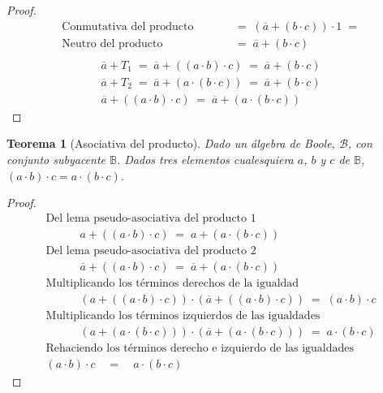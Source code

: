 \documentclass[final,12pt,a4paper,twoside,fleqn]{extbook}
\newcommand{\setB}{\ensuremath{\mathbb{B}}}
\newtheorem{thm}{Teorema}[chapter]
\theoremstyle{definition}
\theoremstyle{remark}
\begin{document}
\begin{proof}
\begin{align}
\text{Conmutativa del producto}\qquad&{}&=\; \left( \overline{a} + \left( b \cdot c \right) \right) \cdot 1 \;=\\
\text{Neutro del producto}\qquad&{}&=\; \overline{a} + \left( b \cdot c \right) \;\;\\
\end{align}
\begin{align}
\overline{a} + T_1 \;=\; \overline{a} + \left( \left( a \cdot b \right) \cdot c \right) \;=\; \overline{a} + \left( b \cdot c \right)\\
\overline{a} + T_2 \;=\; \overline{a} + \left( a \cdot \left( b \cdot c \right) \right) \;=\; \overline{a} + \left( b \cdot c \right)\\
\overline{a} + \left( \left( a \cdot b \right) \cdot c \right) \;=\; \overline{a} + \left( a \cdot \left( b \cdot c \right) \right) 
\end{align}
\end{proof}



\begin{thm}[Asociativa del producto]
Dado un álgebra de Boole, \(\mathscr{B}\), con conjunto subyacente \(\setB\). Dados tres elementos cualesquiera \(a\), \(b\) y \(c\) de \(\setB\), \( ( a \cdot b ) \cdot c = a \cdot ( b \cdot c ) \).
\end{thm}



\begin{proof}
\begin{align}
\text{Del lema pseudo-asociativa del producto 1}\\
\qquad\quad a + \left( \left( a \cdot b \right) \cdot c \right) \;=\; a + \left( a \cdot \left( b \cdot c \right) \right) \\ 
\text{Del lema pseudo-asociativa del producto 2}\\
\qquad\quad \overline{a} + \left( \left( a \cdot b \right) \cdot c \right) \;=\; \overline{a} + \left( a \cdot \left( b \cdot c \right) \right) \\
\text{Multiplicando los términos derechos de la igualdad}\\
\qquad\quad \left(a + \left( \left( a \cdot b \right) \cdot c \right) \right) \cdot \left( \overline{a} + \left( \left( a \cdot b \right) \cdot c \right) \right) \;=\; \left( a \cdot b \right) \cdot c\\
\text{Multiplicando los términos izquierdos de las igualdades}\\ 
\qquad\quad \left( a + \left( a \cdot \left( b \cdot c \right) \right) \right) \cdot \left( \overline{a} + \left( a \cdot \left( b \cdot c \right) \right) \right) \;=\; a \cdot \left( b \cdot c \right)\\
\text{Rehaciendo los términos derecho e izquierdo de las igualdades}\\ 
\left( a \cdot b \right) \cdot c \quad = \quad  a \cdot \left( b \cdot c \right)
\end{align}
\end{proof}
\end{document}
